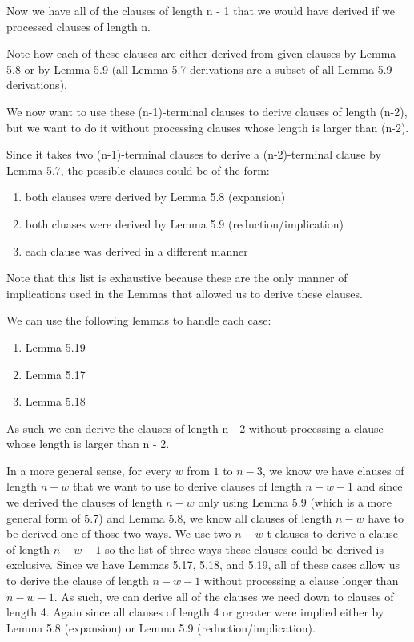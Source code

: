 \documentclass[manuscript]{acmart}
\begin{document}
    Now we have all of the clauses of length n - 1 that we would have derived
    if we processed clauses of length n.

    Note how each of these clauses are either derived from given clauses
    by Lemma 5.8 or by Lemma 5.9 (all Lemma 5.7 derivations are a subset
    of all Lemma 5.9 derivations).

    We now want to use these (n-1)-terminal clauses to derive clauses
    of length (n-2), but we want to do it without processing clauses
    whose length is larger than (n-2).

    Since it takes two (n-1)-terminal clauses to derive a (n-2)-terminal
    clause by Lemma 5.7, the possible clauses could be of the form:

    \begin{enumerate}
        \item both clauses were derived by Lemma 5.8 (expansion)
        \item both cluases were derived by Lemma 5.9 (reduction/implication)
        \item each clause was derived in a different manner
    \end{enumerate}

    Note that this list is exhaustive because these are the only manner
    of implications used in the Lemmas that allowed us to derive these clauses.

    We can use the following lemmas to handle each case:

    \begin{enumerate}
        \item Lemma 5.19
        \item Lemma 5.17
        \item Lemma 5.18
    \end{enumerate}

    As such we can derive the clauses of length n - 2 without processing
    a clause whose length is larger than n - 2.

    In a more general sense, for every $w$ from $1$ to $n-3$, 
    we know we have clauses of length $n-w$ that we want to use to
    derive clauses of length $n-w-1$ and since we derived the clauses
    of length $n-w$ only using Lemma 5.9 (which is a more general form
    of 5.7) and Lemma 5.8, we know all clauses of length $n-w$ have to
    be derived one of those two ways. We use two $n-w$-t clauses to 
    derive a clause of length $n-w-1$ so the list of three ways these
    clauses could be derived is exclusive. Since we have Lemmas 5.17, 
    5.18, and 5.19, all of these cases allow us to derive the clause
    of length $n-w-1$ without processing a clause longer than $n-w-1$.
    As such, we can derive all of the clauses we need down to clauses
    of length 4. Again since all clauses of length 4 or greater were
    implied either by Lemma 5.8 (expansion) or Lemma 5.9 (reduction/implication).
\end{document}
